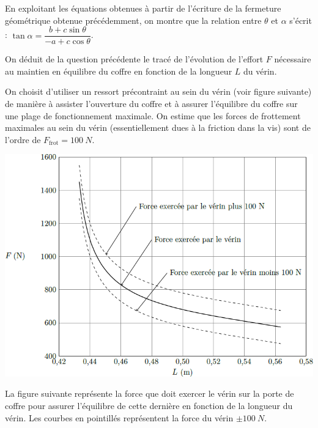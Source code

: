 \documentclass[10pt,fleqn]{article} %
\begin{document}
\begin{multicols}{2}
\begin{multicols}{2}
\begin{corrige}
\end{corrige}
\else
\fi

En exploitant les équations obtenues à partir de l’écriture de la fermeture géométrique obtenue précédemment, on montre que la relation entre $\theta$ et $\alpha$ s’écrit : 
$ \tan \alpha = \dfrac{b+c\sin\theta}{-a+c\cos\theta}$.

On déduit de la question précédente le tracé de l’évolution de l’effort $F$ nécessaire au maintien en équilibre du coffre en fonction de la longueur $L$ du vérin.

On choisit d’utiliser un ressort précontraint au sein du vérin (voir figure suivante) de manière à assister l’ouverture du coffre et à assurer l’équilibre du coffre sur une plage de fonctionnement maximale. On estime que les forces de frottement maximales au sein du vérin (essentiellement dues à la friction dans la vis) sont de l’ordre de $F_{\text{frot}}=\SI{100}{N}$. 


\begin{center}
\includegraphics[width=\linewidth]{images/fig_03}
\end{center}

La figure suivante représente la force que doit exercer le vérin sur la porte de coffre pour assurer
l’équilibre de cette dernière en fonction de la longueur du vérin. Les courbes en pointillés représentent la force du vérin $\pm\SI{100}{N}$.



\end{multicols}
\end{multicols}
\end{document}
